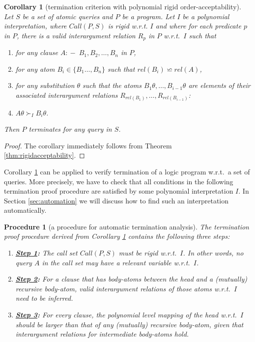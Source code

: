\documentclass[envcountsame]{tlp}
\newcommand{\incase}{:\!\!-\;}
\newcounter{ex:der-lastsymconsctr}
\newtheorem{corollary}{Corollary}
\newtheorem{procedure}{Procedure}
\begin{document}
\begin{corollary}[termination criterion with polynomial rigid order-ac\-ceptability]
\label{prop:polynomialacceptability}
    Let $S$ be a set of atomic queries and $P$ be a program. Let $I$ be a
polynomial interpretation,
where $\mathit{Call}(P,S)$ is rigid w.r.t. $I$
and where for each predicate $p$ in $P$,
there is a valid interargument relation 
$R_{p}$ in $P$ w.r.t.\
$I$ such that 
\begin{enumerate}
    \item[-] for any clause $A \incase B_1,B_2,\ldots,B_n$ in $P$,
    \item[-] for any atom $B_i \in \{B_1\ldots,B_n\}$  such that $\mathit{rel}(B_i) \backsimeq \mathit{rel}(A)$,
    \item[-] for any substitution $\theta$ such that the atoms
	  $B_1\theta, \ldots, B_{i-1}\theta$ are elements of their associated
interargument relations $R_{\mathit{rel}(B_1)}, \ldots,
R_{\mathit{rel}(B_{i-1})}$: \\
   \item[] \begin{center}$A\theta \succ_I B_i\theta$.
 \end{center}
\end{enumerate}
Then $P$ terminates for any query in  $S$.
\end{corollary}
\begin{proof}
The corollary immediately follows from 
Theorem \ref{thm:rigidacceptability}.
\end{proof}

Corollary \ref{prop:polynomialacceptability} can be applied to verify termination of a
logic program w.r.t.\ a set of queries. More precisely, we have to check that all conditions
in the following termination proof procedure are satisfied by some polynomial interpretation 
$I$. In Section \ref{sec:automation} we will discuss how to find such an interpretation
automatically.

\begin{procedure}[a procedure for automatic termination analysis]
The termination proof procedure derived from Corollary \ref{prop:polynomialacceptability}
contains the following three steps:
	\label{proof_procedure}
	\begin{enumerate}
		\item[] \textbf{\underline{Step 1}:} The call set $\mathit{Call}(P,S)$ must
be rigid w.r.t.\ $I$.  In other words, no query $A$ in the call set may have a relevant
variable w.r.t.\ $I$. 
\item[] \textbf{\underline{Step 2}:} For a clause that has 
body-atoms between the head and a (mutually) recursive body-atom,  valid interargument
relations of those atoms w.r.t.\ $I$ need to be inferred. 
\item[] \textbf{\underline{Step 3}:} For every clause, the polynomial level
mapping of the head w.r.t.\ $I$ should be larger than that of any (mutually) recursive
body-atom, given that interargument relations for intermediate body-atoms hold.  
	\end{enumerate}
\end{procedure}
\end{document}
